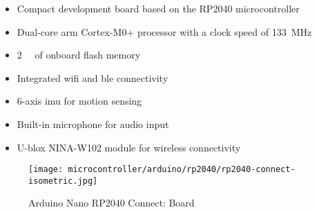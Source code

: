 \begin{frame}
    \begin{itemize}
        \item Compact development board based on the RP2040 microcontroller
        \item Dual-core \acs{arm} Cortex-M0+ processor with a clock speed of \SI{133}{\mega\hertz}
        \item \SI{2}{\mebi\byte} of onboard flash memory
        \item Integrated \acs{wifi} and \ac{ble} connectivity
        \item 6-axis \ac{imu} for motion sensing
        \item Built-in microphone for audio input
        \item U-blox NINA-W102 module for wireless connectivity
    \end{itemize}
    \begin{figure}
        \texttt{[image: microcontroller/arduino/rp2040/rp2040-connect-isometric.jpg]}
        \caption{Arduino\textregistered{} Nano RP2040 Connect: Board}
    \end{figure}
\end{frame}